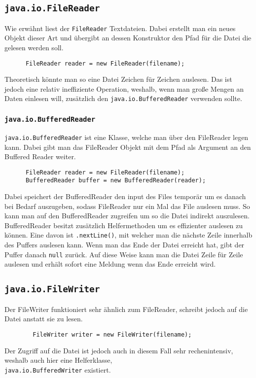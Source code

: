 \documentclass{article}
\begin{document}
	 \subsection{\texorpdfstring{\texttt{java.io.FileReader}}{java.io.FileReader}}
	 Wie erwähnt liest der \verb|FileReader| Textdateien. Dabei erstellt man ein neues Objekt dieser Art und übergibt an dessen Konstruktor den Pfad für die Datei die gelesen werden soll.
	 \begin{verbatim}
	  FileReader reader = new FileReader(filename);
	 \end{verbatim} 
	 Theoretisch könnte man so eine Datei Zeichen für Zeichen auslesen. Das ist jedoch eine relativ ineffiziente Operation, weshalb, wenn man große Mengen an Daten einlesen will, zusätzlich den \verb|java.io.BufferedReader| verwenden sollte. 
	 \subsubsection{\texorpdfstring{\texttt{java.io.BufferedReader}}{java.io.BufferedReader}}
	 \verb|java.io.BufferedReader| ist eine Klasse, welche man über den FileReader legen kann. Dabei gibt man das FileReader Objekt mit dem Pfad als Argument an den Buffered Reader weiter.
	 \begin{verbatim}
	  FileReader reader = new FileReader(filename);
	  BufferedReader buffer = new BufferedReader(reader);
	  \end{verbatim} 
	  Dabei speichert der BufferedReader den input des Files temporär um es danach bei Bedarf auszugeben, sodass FileReader nur ein Mal das File auslesen muss. So kann man auf den BufferedReader zugreifen um so die Datei indirekt auszulesen. BufferedReader besitzt zusätzlich Helfermethoden um es effizienter auslesen zu können. Eine davon ist \verb|.nextLine()|, mit welcher man die nächste Zeile innerhalb des Puffers auslesen kann. Wenn man das Ende der Datei erreicht hat, gibt der Puffer danach \verb|null| zurück. Auf diese Weise kann man die Datei Zeile für Zeile auslesen und erhält sofort eine Meldung wenn das Ende erreicht wird.
	  \subsection{\texorpdfstring{\texttt{java.io.FileWriter}}{java.io.FileWriter}}
	  Der FileWriter funktioniert sehr ähnlich zum FileReader, schreibt jedoch auf die Datei anstatt sie zu lesen. 
	  \begin{verbatim}
	  	FileWriter writer = new FileWriter(filename);  
	  \end{verbatim}  
	  Der Zugriff auf die Datei ist jedoch auch in diesem Fall sehr rechenintensiv, weshalb auch hier eine Helferklasse, \\ \verb|java.io.BufferedWriter| existiert.
\end{document}
